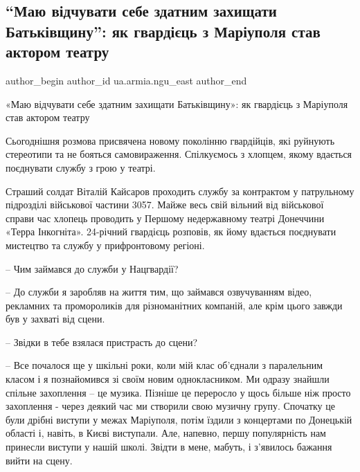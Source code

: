  
 
 
 
 

\subsection{\enquote{Маю відчувати себе здатним захищати Батьківщину}: як гвардієць з Маріуполя став актором театру}
\label{sec:02_02_2022.fb.ua.armia.ngu_east.1._mayu_v_dchuvati_seb}

\ifcmt
 author_begin
   author_id ua.armia.ngu_east
 author_end
\fi

«Маю відчувати себе здатним захищати Батьківщину»: як гвардієць з Маріуполя
став актором театру

Сьогоднішня розмова присвячена новому поколінню гвардійців, які руйнують
стереотипи та не бояться самовираження. Спілкуємось з хлопцем, якому вдається
поєднувати службу з грою у театрі.

Страший солдат Віталій Кайсаров проходить службу за контрактом у патрульному
підрозділі військової частини 3057. Майже весь свій вільний від військової
справи час хлопець проводить у Першому недержавному театрі Донеччини «Терра
Інкогніта». 24-річний гвардієць розповів, як йому вдається поєднувати мистецтво
та службу у прифронтовому регіоні.

– Чим займався до служби у Нацгвардії?

– До служби я заробляв на життя тим, що займався озвучуванням відео, рекламних
та промороликів для різноманітних компаній, але крім цього завжди був у захваті
від сцени.

– Звідки в тебе взялася пристрасть до сцени?

– Все почалося ще у шкільні роки, коли мій клас об'єднали з паралельним класом
і я познайомився зі своїм новим однокласником. Ми одразу знайшли спільне
захоплення – це музика. Пізніше це переросло у щось більше ніж просто
захоплення - через деякий час ми створили свою музичну групу. Спочатку це були
дрібні виступи у межах Маріуполя, потім їздили з концертами по Донецькій
області і, навіть, в Києві виступали. Але, напевно, першу популярність нам
принесли виступи у нашій школі. Звідти в мене, мабуть, і з'явилось бажання
вийти на сцену. 

